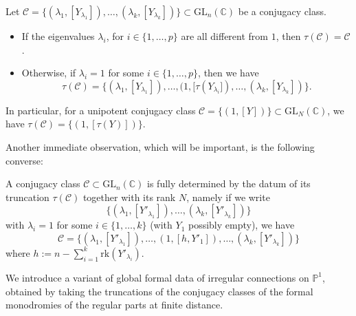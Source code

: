 \documentclass[11pt,a4paper]{amsart}
\numberwithin{equation}{section}
\begin{document}
\begin{lemma}
\label{lemma:truncation_in_terms_of_Young_diag}
Let $\mathcal C=\{(\lambda_1, [Y_{\lambda_1}]), \dots, (\lambda_k, [Y_{\lambda_k}])\}\subset \mathrm{GL}_n(\mathbb C)$ be a conjugacy class. 

\begin{itemize}
\item If the eigenvalues $\lambda_i$, for $i\in \{1, \dots, p\}$ are all different from $1$, then $\tau(\mathcal C)=\mathcal C$. 
\item Otherwise, if $\lambda_i=1$ for some $i\in \{1,\dots, p\}$, then we have
\[
\tau(\mathcal C)=\{(\lambda_1, [Y_{\lambda_1}]), \dots, (1, [\tau(Y_{\lambda_i}]), \dots, (\lambda_k, [Y_{\lambda_k}])\}.
\]
\end{itemize}
\end{lemma}

In particular, for a unipotent conjugacy class $\mathcal C=\{(1, [Y])\}\subset \mathrm{GL}_N(\mathbb C)$, we have $\tau(\mathcal C)=\{(1, [\tau(Y)])\}$.

Another immediate observation, which will be important, is the following converse:

\begin{lemma}
\label{lemma:reconstruction_conjugacy_class_from_truncation}
A conjugacy class $\mathcal C\subset\mathrm{GL}_n(\mathbb C)$ is fully determined by the datum of its truncation $\tau(\mathcal C)$ together with its rank $N$, namely if we write 
\[
\{(\lambda_1, [Y'_{\lambda_1}]), \dots, (\lambda_k, [Y'_{\lambda_k}])\}
\]
with $\lambda_i=1$ for some $i\in \{1, \dots, k\}$ (with $Y_1$ possibly empty), we have
\[
\mathcal C=\{(\lambda_1, [Y'_{\lambda_1}]), \dots, (1, [h,Y'_{1}]), \dots, (\lambda_k, [Y'_{\lambda_k}])\}
\]
where $h:=n-\sum_{i=1}^k \mathrm{rk}(Y'_{\lambda_i})$.
\end{lemma}

We introduce a variant of global formal data of irregular connections on $\mathbb P^1$, obtained by taking the truncations of the conjugacy classes of the formal monodromies of the regular parts  at finite distance.
\end{document}
